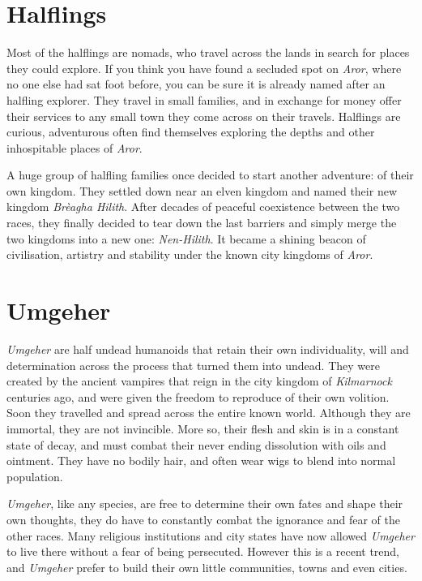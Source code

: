 \section*{Halflings}

Most of the halflings are nomads, who travel across the lands in search for
places they could explore. If you think you have found a secluded spot on
\emph{Aror}, where no one else had sat foot before, you can be sure it is
already named after an halfling explorer. They travel in small families, and
in exchange for money offer their services to any small town they come across
on their travels. Halflings are curious, adventurous often find themselves
exploring the depths and other inhospitable places of \emph{Aror}.

A huge group of halfling families once decided to start another adventure: of
their own kingdom. They settled down near an elven kingdom and named their new
kingdom \emph{Brèagha Hilith}. After decades of peaceful coexistence between
the two races, they finally decided to tear down the last barriers and simply
merge the two kingdoms into a new one: \emph{Nen-Hilith}. It became a shining
beacon of civilisation, artistry and stability under the known city kingdoms
of \emph{Aror}.


\section*{Umgeher}



\emph{Umgeher} are half undead humanoids that retain their own individuality,
will and determination across the process that turned them into undead. They
were created by the ancient vampires that reign in the city kingdom of
\emph{Kilmarnock} centuries ago, and were given the freedom to reproduce of
their own volition. Soon they travelled and spread across the entire known
world. Although they are immortal, they are not invincible. More so, their
flesh and skin is in a constant state of decay, and must combat their never
ending dissolution with oils and ointment. They have no bodily hair, and often
wear wigs to blend into normal population.

\emph{Umgeher}, like any species, are free to determine their own fates and
shape their own thoughts, they do have to constantly combat the ignorance and
fear of the other races. Many religious institutions and city states have now
allowed \emph{Umgeher} to live there without a fear of being
persecuted. However this is a recent trend, and \emph{Umgeher} prefer to build
their own little communities, towns and even cities.

